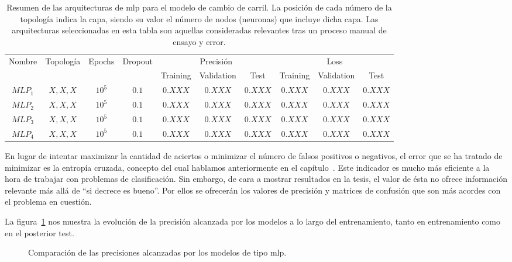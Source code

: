\begin{table}
	\caption[Resumen de las arquitecturas \ac{mlp} para el modelo de cambio de carril]{Resumen de las arquitecturas de \ac{mlp} para el modelo de cambio de carril. La posición de cada número de la topología indica la capa, siendo su valor el número de nodos (neuronas) que incluye dicha capa. Las arquitecturas seleccionadas en esta tabla son aquellas consideradas relevantes tras un proceso manual de ensayo y error.}
	\label{tbl:lc-mlp-architectures}
	\begin{tabular}{cccccccccc}
		\hline
		\multirow{2}{*}{Nombre} & \multirow{2}{*}{Topología} & \multirow{2}{*}{Epochs} & \multirow{2}{*}{Dropout} & \multicolumn{3}{c}{Precisión} & \multicolumn{3}{c}{Loss}      \\
		& & & & Training & Validation & Test & Training & Validation & Test \\ \hline
		$MLP_1$ & $X, X, X$ & $10^5$ & $0.1$ & $0.XXX$ & $0.XXX$ & $0.XXX$ & $0.XXX$ & $0.XXX$ & $0.XXX$ \\
		$MLP_2$ & $X, X, X$ & $10^5$ & $0.1$ & $0.XXX$ & $0.XXX$ & $0.XXX$ & $0.XXX$ & $0.XXX$ & $0.XXX$ \\
		$MLP_3$ & $X, X, X$ & $10^5$ & $0.1$ & $0.XXX$ & $0.XXX$ & $0.XXX$ & $0.XXX$ & $0.XXX$ & $0.XXX$ \\
		$MLP_4$ & $X, X, X$ & $10^5$ & $0.1$ & $0.XXX$ & $0.XXX$ & $0.XXX$ & $0.XXX$ & $0.XXX$ & $0.XXX$ \\ \hline
	\end{tabular}
\end{table}

En lugar de intentar maximizar la cantidad de aciertos o minimizar el número de falsos positivos o negativos, el error que se ha tratado de minimizar es la entropía cruzada, concepto del cual hablamos anteriormente en el capítulo~. Este indicador es mucho más eficiente a la hora de trabajar con problemas de clasificación. Sin embargo, de cara a mostrar resultados en la tesis, el valor de ésta no ofrece información relevante más allá de \enquote{si decrece es bueno}. Por ellos se ofrecerán los valores de precisión y matrices de confusión que son más acordes con el problema en cuestión.

La figura~\ref{fig:lc-mlp-accuracy-comparison} nos muestra la evolución de la precisión alcanzada por los modelos a lo largo del entrenamiento, tanto en entrenamiento como en el posterior test.

\begin{figure}
	\centering
	\qquad
	\caption[Comparación de las precisiones alcanzadas por los modelos de tipo \ac{mlp}]{Comparación de las precisiones alcanzadas por los modelos de tipo \ac{mlp}.}
	\label{fig:lc-mlp-accuracy-comparison}
\end{figure}

